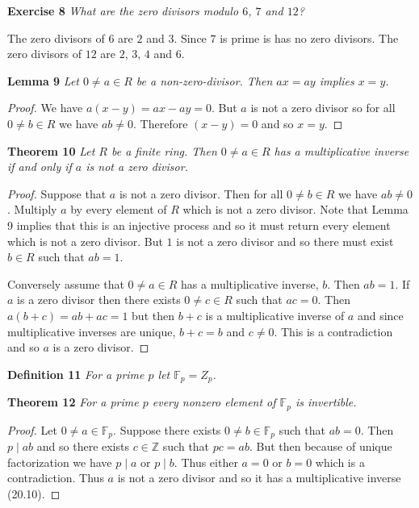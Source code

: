 \documentclass{article}
\begin{document}
\begin{flushleft}
\textbf{Exercise 8}
\textsl{What are the zero divisors modulo $6$, $7$ and $12$?}\newline

The zero divisors of $6$ are $2$ and $3$. Since $7$ is prime is has no zero divisors. The zero divisors of $12$ are $2$, $3$, $4$ and $6$.\newline

\textbf{Lemma 9}
\textsl{Let $0 \neq a \in R$ be a non-zero-divisor. Then $ax=ay$ implies $x=y$.}
\begin{proof}
We have $a(x-y) = ax-ay = 0$. But $a$ is not a zero divisor so for all $0 \neq b \in R$ we have $ab \neq 0$. Therefore $(x-y) = 0$ and so $x=y$.
\end{proof}

\textbf{Theorem 10}
\textsl{Let $R$ be a finite ring. Then $0 \neq a \in R$ has a multiplicative inverse if and only if $a$ is not a zero divisor.}
\begin{proof}
Suppose that $a$ is not a zero divisor. Then for all $0 \neq b \in R$ we have $ab \neq 0$. Multiply $a$ by every element of $R$ which is not a zero divisor. Note that Lemma 9 implies that this is an injective process and so it must return every element which is not a zero divisor. But $1$ is not a zero divisor and so there must exist $b \in R$ such that $ab = 1$.\newline

Conversely assume that $0 \neq a \in R$ has a multiplicative inverse, $b$. Then $ab = 1$. If $a$ is a zero divisor then there exists $0 \neq c \in R$ such that $ac = 0$. Then $a(b+c) = ab + ac = 1$ but then $b+c$ is a multiplicative inverse of $a$ and since multiplicative inverses are unique, $b+c = b$ and $c \neq 0$. This is a contradiction and so $a$ is a zero divisor.
\end{proof}

\textbf{Definition 11}
\textsl{For a prime $p$ let $\mathbb{F}_p = Z_p$.}\newline

\textbf{Theorem 12}
\textsl{For a prime $p$ every nonzero element of $\mathbb{F}_p$ is invertible.}
\begin{proof}
Let $0 \neq a \in \mathbb{F}_p$. Suppose there exists $0 \neq b \in \mathbb{F}_p$ such that $ab = 0$. Then $p \mid ab$ and so there exists $c \in \mathbb{Z}$ such that $pc = ab$. But then because of unique factorization we have $p \mid a$ or $p \mid b$. Thus either $a = 0$ or $b = 0$ which is a contradiction. Thus $a$ is not a zero divisor and so it has a multiplicative inverse (20.10).
\end{proof}


\end{flushleft}
\end{document}
